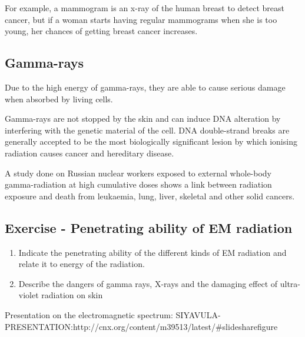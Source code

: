 For example, a mammogram is an x-ray of the human breast to detect breast cancer, but if a woman starts having regular mammograms when she is too young, her chances of getting breast cancer increases.

\subsection{Gamma-rays}
Due to the high energy of gamma-rays, they are able to cause serious damage when absorbed by living cells.

Gamma-rays are not stopped by the skin and can induce DNA alteration by interfering with the genetic material of the cell. DNA double-strand breaks are generally accepted to be the most biologically significant lesion by which ionising radiation causes cancer and hereditary disease.

A study done on Russian nuclear workers exposed to external whole-body gamma-radiation at high cumulative doses shows a link between radiation exposure and death from leukaemia, lung, liver, skeletal and other solid cancers.



\subsection {Exercise - Penetrating ability of EM radiation}
\begin{enumerate}
\item Indicate the penetrating ability of the different kinds of EM radiation and relate it to energy of the radiation.
\item Describe the dangers of gamma rays, X-rays and the damaging effect of ultra-violet radiation on skin
\end{enumerate}
Presentation on the electromagnetic spectrum: SIYAVULA-PRESENTATION:http://cnx.org/content/m39513/latest/#slidesharefigure
